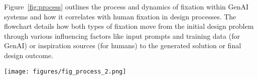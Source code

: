 Figure~\ref{fig:process} outlines the process and dynamics of fixation within GenAI systems and how it correlates with human fixation in design processes. The flowchart details how both types of fixation move from the initial design problem through various influencing factors like input prompts and training data (for GenAI) or inspiration sources (for humans) to the generated solution or final design outcome.


\begin{figure*}[htp]
    \centering
    \texttt{[image: figures/fig\_process\_2.png]}
    \caption{The process and dynamics of fixation within GenAI systems and how it correlates with human fixation in design processes.}
    \label{fig:process}
    \Description{}
\end{figure*}







